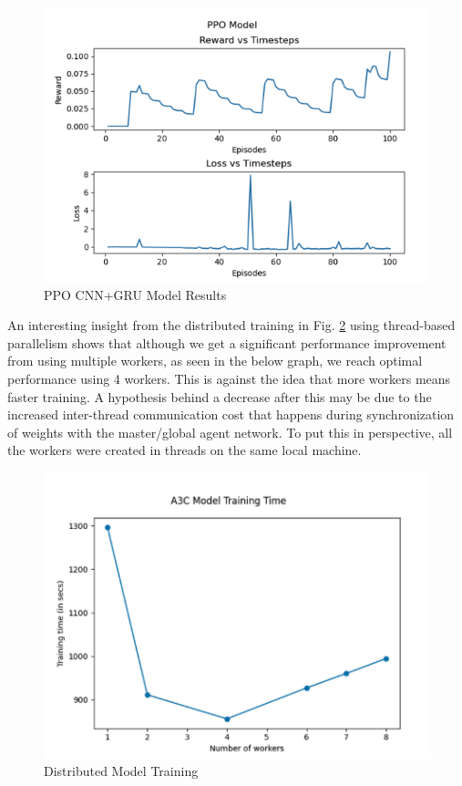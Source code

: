 \documentclass[conference]{IEEEtran}
\begin{document}
\begin{figure}[h!]
    \centering
    \includegraphics[width=\linewidth]{ppo_gru_results.png}
    \caption{PPO CNN+GRU Model Results}
    \label{ppo_gru_result}
\end{figure}

An interesting insight from the distributed training in Fig. \ref{multi_worker_graph} using thread-based parallelism shows that although we get a significant performance improvement from using multiple workers, as seen in the below graph, we reach optimal performance using 4 workers. This is against the idea that more workers means faster training. A hypothesis behind a decrease after this may be due to the increased inter-thread communication cost that happens during synchronization of weights with the master/global agent network. To put this in perspective, all the workers were created in threads on the same local machine.

\begin{figure}[h!]
    \centering
    \includegraphics[width=\linewidth]{multi_worker.png}
    \caption{Distributed Model Training}
    \label{multi_worker_graph}
\end{figure}
\end{document}
